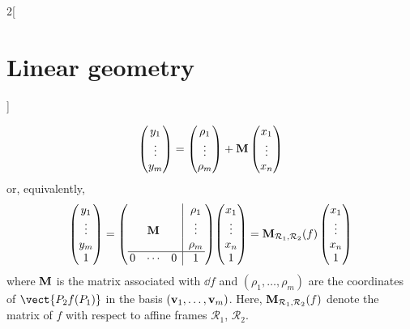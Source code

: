 \documentclass[../../../main_math.tex]{subfiles}
\begin{document}
\begin{multicols}{2}[\section{Linear geometry}]
\begin{proposition}
    $$
      \begin{pmatrix}
        y_1    \\
        \vdots \\
        y_m    \\
      \end{pmatrix}
      =
      \begin{pmatrix}
        \rho_1 \\
        \vdots \\
        \rho_m \\
      \end{pmatrix}
      +\boldsymbol{\mathrm{M}}
      \begin{pmatrix}
        x_1    \\
        \vdots \\
        x_n    \\
      \end{pmatrix}$$
    or, equivalently,
    $$
      \begin{pmatrix}
        y_1    \\
        \vdots \\
        y_m    \\
        1      \\
      \end{pmatrix}
      =\left(
      \begin{array}{@{\,}c cc|c@{\,}}
            &        &   & \rho_1 \\
            & \vf{M} &   & \vdots \\
            &        &   & \rho_m \\
          \hline
          0 & \cdots & 0 & 1
        \end{array}\right)\!
      \begin{pmatrix}
        x_1    \\
        \vdots \\
        x_n    \\
        1      \\
      \end{pmatrix}
      =\vf{M}_{\mathcal{R}_1,\mathcal{R}_2}(f)
      \begin{pmatrix}
        x_1    \\
        \vdots \\
        x_n    \\
        1      \\
      \end{pmatrix}$$
    where $\boldsymbol{\mathrm{M}}$ is the matrix associated with $\dd{f}$ and $(\rho_1,\ldots,\rho_m)$ are the coordinates of $\vect{P_2f(P_1)}$ in the basis $(\boldsymbol{\mathrm{v}}_1,\ldots,\boldsymbol{\mathrm{v}}_m)$. Here, $\boldsymbol{\mathrm{M}}_{\mathcal{R}_1,\mathcal{R}_2}(f)$ denote the matrix of $f$ with respect to affine frames $\mathcal{R}_1$, $\mathcal{R}_2$.
  \end{proposition}

\end{multicols}
\end{document}
